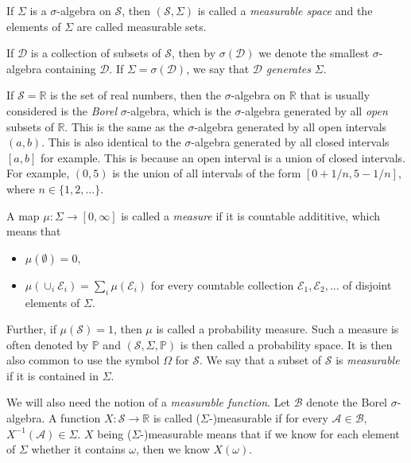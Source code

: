 \documentclass[11pt]{article}
\theoremstyle{plain}
\theoremstyle{definition}
\newcommand{\reals}{\mathbb{R}}
\begin{document}
If $\Sigma$ is a $\sigma$-algebra on $\mathcal{S}$, then $(\mathcal{S},\Sigma)$ is called a \emph{measurable space} and the elements of $\Sigma$  are called measurable sets. 

If $\mathcal{D}$ is a collection of subsets of $\mathcal{S}$, then by $\sigma(\mathcal{D})$  we denote the smallest $\sigma$-algebra containing $\mathcal{D}$.  If $\Sigma = \sigma(\mathcal{D})$, we say that $\mathcal{D}$ \emph{generates} $\Sigma$. 

If $\mathcal{S}=\reals$ is the set of real numbers, then the $\sigma$-algebra on $\reals$ that is usually considered is the \emph{Borel} $\sigma$-algebra, which is the $\sigma$-algebra  generated by all \emph{open} subsets of $\reals$. This is the same as the $\sigma$-algebra  generated by all open intervals $(a,b)$. This is also identical to the $\sigma$-algebra  generated by all closed intervals $[a,b]$ for example. This is because an open interval is a union of closed intervals. For example, $(0,5)$ is the union of all intervals of the form  $[0+1/n,5-1/n]$, where $n\in\{1,2,...\}$.

A map $\mu: \Sigma \rightarrow [0,\infty]$ is called a \emph{measure} if it is countable addititive, which means that
\begin{itemize}
\item $\mu(\emptyset)=0,$
\item $\mu(\cup_i\mathcal{E}_i) =  \sum_i \mu(\mathcal{E}_i)$ for every countable collection $\mathcal{E}_1, \mathcal{E}_2,...$ of disjoint elements of $\Sigma$.
\end{itemize}
Further, if $\mu(\mathcal{S})=1$, then $\mu$ is called a probability measure. Such a measure is often denoted by $\mathbb{P}$ and $(\mathcal{S}, \Sigma, \mathbb{P})$ is then called a probability space. It is then also common to use the symbol $\Omega$ for $\mathcal{S}$. We say that a subset of $\mathcal{S}$ is \emph{measurable} if it is contained in $\Sigma$.

We will also need the notion of a \emph{measurable function}. Let $\mathcal{B}$ denote the Borel $\sigma$-algebra. A function
$X: \mathcal{S} \rightarrow \reals$ is called ($\Sigma$-)measurable if for every $\mathcal{A}\in \mathcal{B}$, $X^{-1}(\mathcal{A})\in \Sigma$. $X$ being ($\Sigma$-)measurable means that if we know for each element of $\Sigma$ whether it contains $\omega$, then we know $X(\omega)$.
\end{document}
